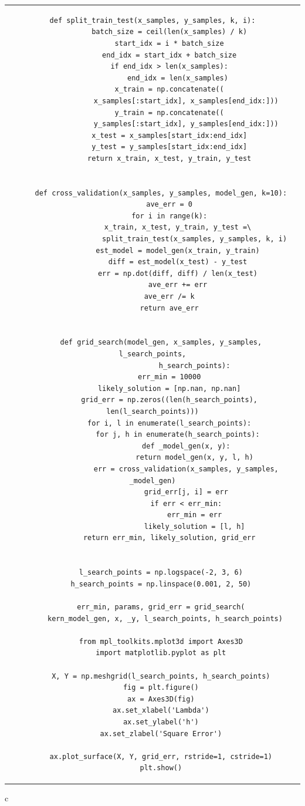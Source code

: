 \documentclass[fleqn]{jsarticle}
\begin{document}
\begin{center}
\begin{tabular}{c}
  \begin{lstlisting}[caption=Cross Validation and Grid Search,label=src_cross_validation]
    def split_train_test(x_samples, y_samples, k, i):
        batch_size = ceil(len(x_samples) / k)
        start_idx = i * batch_size
        end_idx = start_idx + batch_size
        if end_idx > len(x_samples):
            end_idx = len(x_samples)
        x_train = np.concatenate((
                x_samples[:start_idx], x_samples[end_idx:]))
        y_train = np.concatenate((
                y_samples[:start_idx], y_samples[end_idx:]))
        x_test = x_samples[start_idx:end_idx]
        y_test = y_samples[start_idx:end_idx]
        return x_train, x_test, y_train, y_test


    def cross_validation(x_samples, y_samples, model_gen, k=10):
        ave_err = 0
        for i in range(k):
            x_train, x_test, y_train, y_test =\
                    split_train_test(x_samples, y_samples, k, i)
            est_model = model_gen(x_train, y_train)
            diff = est_model(x_test) - y_test
            err = np.dot(diff, diff) / len(x_test)
            ave_err += err
        ave_err /= k
        return ave_err


    def grid_search(model_gen, x_samples, y_samples, l_search_points,
                    h_search_points):
        err_min = 10000
        likely_solution = [np.nan, np.nan]
        grid_err = np.zeros((len(h_search_points), len(l_search_points)))
        for i, l in enumerate(l_search_points):
            for j, h in enumerate(h_search_points):
                def _model_gen(x, y):
                    return model_gen(x, y, l, h)
                err = cross_validation(x_samples, y_samples, _model_gen)
                grid_err[j, i] = err
                if err < err_min:
                    err_min = err
                    likely_solution = [l, h]
        return err_min, likely_solution, grid_err


    l_search_points = np.logspace(-2, 3, 6)
    h_search_points = np.linspace(0.001, 2, 50)

    err_min, params, grid_err = grid_search(
      kern_model_gen, x, _y, l_search_points, h_search_points)

    from mpl_toolkits.mplot3d import Axes3D
    import matplotlib.pyplot as plt

    X, Y = np.meshgrid(l_search_points, h_search_points)
    fig = plt.figure()
    ax = Axes3D(fig)
    ax.set_xlabel('Lambda')
    ax.set_ylabel('h')
    ax.set_zlabel('Square Error')

    ax.plot_surface(X, Y, grid_err, rstride=1, cstride=1)
    plt.show()
  \end{lstlisting}
\end{tabular}{c}
\end{center}
\end{document}
